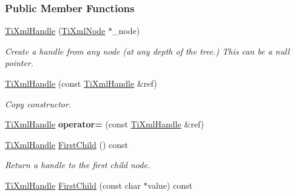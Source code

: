 \subsubsection*{Public Member Functions}
\begin{DoxyCompactItemize}
\item 
\hypertarget{class_ti_xml_handle_aba18fd7bdefb942ecdea4bf4b8e29ec8}{
\hyperlink{class_ti_xml_handle_aba18fd7bdefb942ecdea4bf4b8e29ec8}{TiXmlHandle} (\hyperlink{class_ti_xml_node}{TiXmlNode} $\ast$\_\-node)}
\label{class_ti_xml_handle_aba18fd7bdefb942ecdea4bf4b8e29ec8}

\begin{DoxyCompactList}\small\item\em Create a handle from any node (at any depth of the tree.) This can be a null pointer. \item\end{DoxyCompactList}\item 
\hypertarget{class_ti_xml_handle_a236d7855e1e56ccc7b980630c48c7fd7}{
\hyperlink{class_ti_xml_handle_a236d7855e1e56ccc7b980630c48c7fd7}{TiXmlHandle} (const \hyperlink{class_ti_xml_handle}{TiXmlHandle} \&ref)}
\label{class_ti_xml_handle_a236d7855e1e56ccc7b980630c48c7fd7}

\begin{DoxyCompactList}\small\item\em Copy constructor. \item\end{DoxyCompactList}\item 
\hypertarget{class_ti_xml_handle_ad8e5dcf6a87882674203157f29f8e4db}{
\hyperlink{class_ti_xml_handle}{TiXmlHandle} {\bfseries operator=} (const \hyperlink{class_ti_xml_handle}{TiXmlHandle} \&ref)}
\label{class_ti_xml_handle_ad8e5dcf6a87882674203157f29f8e4db}

\item 
\hypertarget{class_ti_xml_handle_acdb1faaf88a700b40ca2c8d9aee21139}{
\hyperlink{class_ti_xml_handle}{TiXmlHandle} \hyperlink{class_ti_xml_handle_acdb1faaf88a700b40ca2c8d9aee21139}{FirstChild} () const }
\label{class_ti_xml_handle_acdb1faaf88a700b40ca2c8d9aee21139}

\begin{DoxyCompactList}\small\item\em Return a handle to the first child node. \item\end{DoxyCompactList}\item 
\hypertarget{class_ti_xml_handle_a8c61f64ae9365d89c264f289085541f8}{
\hyperlink{class_ti_xml_handle}{TiXmlHandle} \hyperlink{class_ti_xml_handle_a8c61f64ae9365d89c264f289085541f8}{FirstChild} (const char $\ast$value) const }
\label{class_ti_xml_handle_a8c61f64ae9365d89c264f289085541f8}


\end{DoxyCompactItemize}
